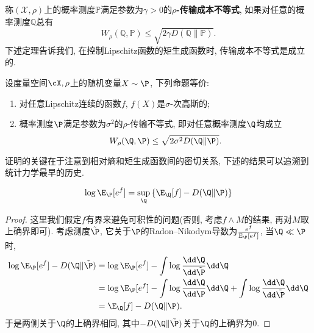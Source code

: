 称$(\mathcal{X}, \rho)$上的概率测度$\mathbb{P}$满足参数为$\gamma > 0$的\textbf{$\rho$-传输成本不等式}, 如果对任意的概率测度$\mathbb{Q}$总有
 \begin{equation}\label{eq:TransportationCostInequality}
 	W_{\rho} (\mathbb{Q}, \mathbb{P}) \leq \sqrt{2 \gamma D(\mathbb{Q} \| \mathbb{P})}.
 \end{equation}
下述定理告诉我们, 在控制Lipschitz函数的矩生成函数时, 传输成本不等式是成立的. 

\begin{theorem}\label{thm:Bobkov-Götze}
	设度量空间$\cX, \rho$上的随机变量$X \sim \P$, 下列命题等价: 
	\begin{enumerate}
		\item 对任意Lipschitz连续的函数$f$, $f(X)$是$\sigma$-次高斯的;
		\item 概率测度$\P$满足参数为$\sigma^2$的$\rho$-传输不等式, 即对任意概率测度$\Q$均成立
			\begin{equation*}
				W_{\rho}(\Q, \P) \leq \sqrt{2 \sigma^2 D(\Q \| \P)}. 
			\end{equation*}
	\end{enumerate}
\end{theorem}

证明的关键在于注意到相对熵和矩生成函数间的密切关系, 下述的结果可以追溯到统计力学最早的历史. 
\begin{lemma}[Gibbs变分原理]\label{lemma:GibbsVariation}
	\begin{equation*}
		\log \E_{\P}[e^f] = \sup_{\Q} \left\{ \E_{\Q} [f] - D(\Q \| \P) \right\}
	\end{equation*}
\end{lemma}
\begin{proof}
	这里我们假定$f$有界来避免可积性的问题(否则, 考虑$f \wedge M$的结果, 再对$M$取上确界即可). 
	考虑测度$\tilde{\P}$, 它关于$\P$的Radon–Nikodym导数为$\frac{e^{f}}{\mathbb{E}_{\P}[e^{f}]}$, 当$\Q \ll \P$时, 
	\begin{align*}
		\log \E_{\P}[e^f] - D(\Q \| \tilde{\P})
		&= \log \E_{\P}[e^f] - \int \log \frac{\dd \Q}{\dd \tilde{\P}} \dd \Q \\
		&= \log \E_{\P}[e^f] - \int \log \frac{\dd \Q}{\dd \P} \dd \Q + \int \log \frac{\dd \Q}{\dd \tilde{\P}} \dd \Q \\
		&= \E_{\Q}[f] - D(\Q \| \P). 
	\end{align*}
	于是两侧关于$\Q$的上确界相同, 其中$- D(\Q \| \tilde{\P})$关于$\Q$的上确界为$0$.   
\end{proof}

